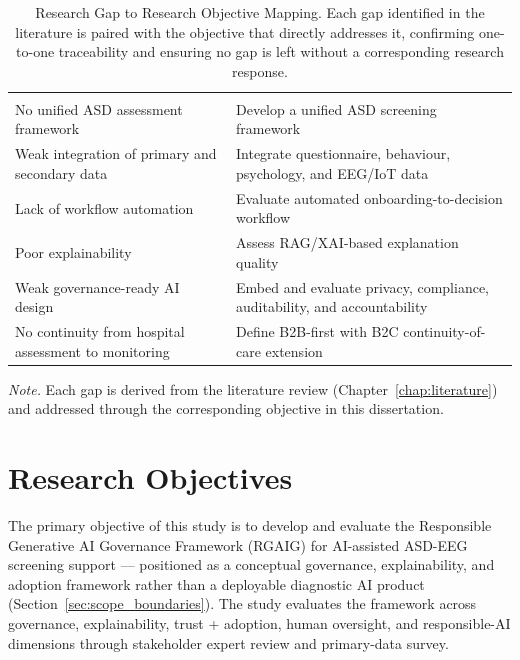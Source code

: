 {\tablestripes\tablefontsize
\begin{xltabular}{\textwidth}{@{} L L @{}}
\caption[Research Gap to Research Objective Mapping]{Research Gap to Research Objective Mapping. Each gap identified in the literature is paired with the objective that directly addresses it, confirming one-to-one traceability and ensuring no gap is left without a corresponding research response.}\label{tab:gap_to_objective} \\
\toprule
{} &  \\
\midrule
\endfirsthead
\toprule
{} &  \\
\midrule
\endhead
\bottomrule
\endlastfoot
No unified ASD assessment framework & Develop a unified ASD screening framework \\
Weak integration of primary and secondary data & Integrate questionnaire, behaviour, psychology, and EEG/IoT data \\
Lack of workflow automation & Evaluate automated onboarding-to-decision workflow \\
Poor explainability & Assess RAG/XAI-based explanation quality \\
Weak governance-ready AI design & Embed and evaluate privacy, compliance, auditability, and accountability \\
No continuity from hospital assessment to monitoring & Define B2B-first with B2C continuity-of-care extension \\
\end{xltabular}}
\vspace{2pt}
\noindent\textit{Note.} Each gap is derived from the literature review (Chapter~\ref{chap:literature}) and addressed through the corresponding objective in this dissertation.

\section{Research Objectives}
\label{sec:research_purpose}

The primary objective of this study is to develop and evaluate the Responsible Generative AI Governance Framework (RGAIG) for AI-assisted ASD-EEG screening support — positioned as a conceptual governance, explainability, and adoption framework rather than a deployable diagnostic AI product (Section~\ref{sec:scope_boundaries}). The study evaluates the framework across governance, explainability, trust + adoption, human oversight, and responsible-AI dimensions through stakeholder expert review and primary-data survey.


